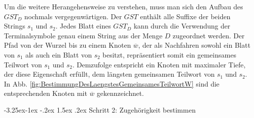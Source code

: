 \documentclass[12pt]{report}
\makeatletter
\renewcommand\paragraph{\@startsection{paragraph}{4}{\z@}%
    {-3.25ex\@plus -1ex \@minus -.2ex}%
    {1.5ex \@plus .2ex}%
    {\normalfont\normalsize\bfseries}}
\makeatother
\begin{document}
Um die weitere Herangehensweise zu verstehen, muss man sich den Aufbau des $GST_D$ nochmals vergegenwärtigen. Der $GST$ enthält alle Suffixe der beiden Strings $s_1$ und $s_2$. Jedes Blatt eines $GST_D$ kann durch die Verwendung der Terminalsymbole genau einem String aus der Menge $D$ zugeordnet werden. Der Pfad von der Wurzel bis zu einem Knoten $\overline{w}$, der als Nachfahren sowohl ein Blatt von $s_1$ als auch ein Blatt von $s_2$ besitzt, repräsentiert somit ein gemeinsames Teilwort von $s_1$ und $s_2$. Demzufolge entspricht ein Knoten mit maximaler Tiefe, der diese Eigenschaft erfüllt, dem längsten gemeinsamen Teilwort von $s_1$ und $s_2$. In Abb. \ref{fig:BestimmungDesLaengstesGemeinsamesTeilwortW} sind die entsprechenden Knoten mit $\overline{w}$ gekennzeichnet.

\paragraph{Schritt 2: Zugehörigkeit bestimmen}
\end{document}
